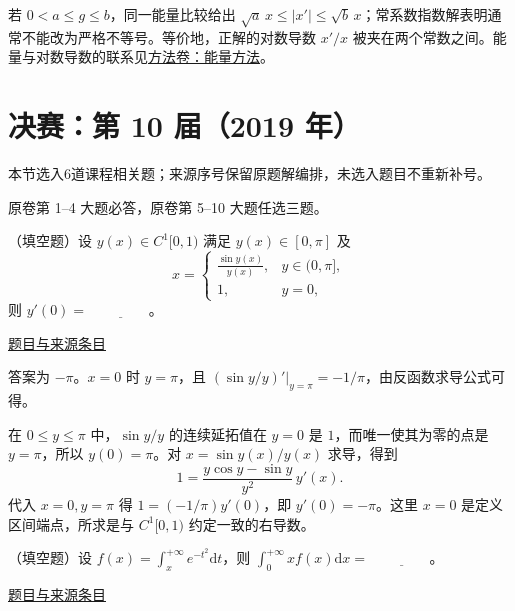 \documentclass[12pt,fontset=fandol]{ctexart}
\begin{document}
\begin{remark}[方法与条件]若 $0<a\leq g\leq b$，同一能量比较给出 $\sqrt a\,x\leq|x'|\leq\sqrt b\,x$；常系数指数解表明通常不能改为严格不等号。等价地，正解的对数导数 $x'/x$ 被夹在两个常数之间。能量与对数导数的联系见\hyperref[app:dynamics-energy]{方法卷：能量方法}。\end{remark}

\section{决赛：第 10 届（2019 年）}

本节选入6道课程相关题；来源序号保留原题解编排，未选入题目不重新补号。

\begin{remark}[来源说明]原卷第 1--4 大题必答，原卷第 5--10 大题任选三题。\end{remark}

\begin{example}[来源序号2]\label{ex:fin10-hi:2}\label{pr:fin10-hi:2}

（填空题）设 $y(x) \in C^{1}[0,1)$ 满足 $y(x) \in [0,\pi]$ 及
\[
x = \begin{cases} \frac{\sin y(x)}{y(x)}, & y \in (0,\pi], \\ 1, & y=0, \end{cases}
\]
则 $y'(0) = $ $\underline{\qquad\qquad}$。

\par\href{https://github.com/lzxcr/cmc-mathematics/blob/64916fa1fdbc3e444a652eca204d5669058ee321/src/problems/finals/10/02.md}{题目与来源条目}

\end{example}

\begin{solve}\label{ans:fin10-hi:2}

答案为 $-\pi$。$x=0$ 时 $y=\pi$，且 $\left.(\sin y/y)'\right|_{y=\pi}=-1/\pi$，由反函数求导公式可得。

在 $0\le y\le\pi$ 中，$\sin y/y$ 的连续延拓值在 $y=0$ 是 $1$，而唯一使其为零的点是 $y=\pi$，所以 $y(0)=\pi$。对 $x=\sin y(x)/y(x)$ 求导，得到
\[
1=\frac{y\cos y-\sin y}{y^2}\,y'(x).
\]
代入 $x=0,y=\pi$ 得 $1=(-1/\pi)y'(0)$，即 $y'(0)=-\pi$。这里 $x=0$ 是定义区间端点，所求是与 $C^1[0,1)$ 约定一致的右导数。

\end{solve}

\begin{example}[来源序号3]\label{ex:fin10-hi:3}\label{pr:fin10-hi:3}

（填空题）设 $f(x) = \int_{x}^{+\infty} e^{-t^{2}} \mathrm{d} t$，则 $\int_{0}^{+\infty} xf(x) \mathrm{d} x = $ $\underline{\qquad\qquad}$。

\par\href{https://github.com/lzxcr/cmc-mathematics/blob/64916fa1fdbc3e444a652eca204d5669058ee321/src/problems/finals/10/03.md}{题目与来源条目}

\end{example}
\end{document}
